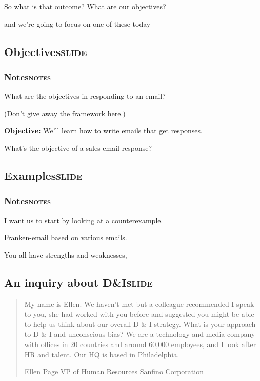 \documentclass[11pt]{article}
\begin{document}
So what is that outcome? What are our objectives?

and we're going to focus on one of these today

\subsection{Objectives\hfill{}\textsc{slide}}
\label{sec:org2e3594e}
\subsubsection{Notes\hfill{}\textsc{notes}}
\label{sec:orge88619b}
What are the objectives in responding to an email?

(Don't give away the framework here.)

\textbf{Objective:} We'll learn how to write emails that get responses.

What's the objective of a sales email response?

\subsection{Examples\hfill{}\textsc{slide}}
\label{sec:org9e1e094}

\subsubsection{Notes\hfill{}\textsc{notes}}
\label{sec:org6b4ca29}
I want us to start by looking at a counterexample.

Franken-email based on various emails.

You all have strengths and weaknesses,

\subsection{An inquiry about D\&I\hfill{}\textsc{slide}}
\label{sec:orgaf19327}

\begin{quote}
My name is Ellen. We haven't met but a colleague recommended I speak to you, she had worked with you before and suggested you might be able to help us think about our overall D \& I strategy. What is your approach to D \& I and unconscious bias? We are a technology and media company with offices in 20 countries and around 60,000 employees, and I look after HR and talent. Our HQ is based in Philadelphia.

Ellen Page
VP of Human Resources
Sanfino Corporation
\end{quote}
\end{document}
